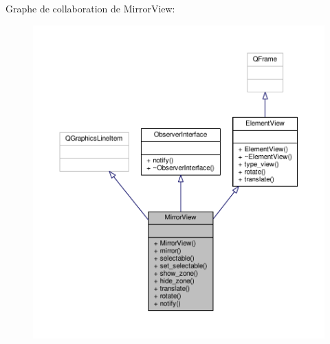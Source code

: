 Graphe de collaboration de Mirror\+View\+:
\nopagebreak
\begin{figure}[H]
\begin{center}
\leavevmode
\includegraphics[width=350pt]{d1/de7/classMirrorView__coll__graph}
\end{center}
\end{figure}
